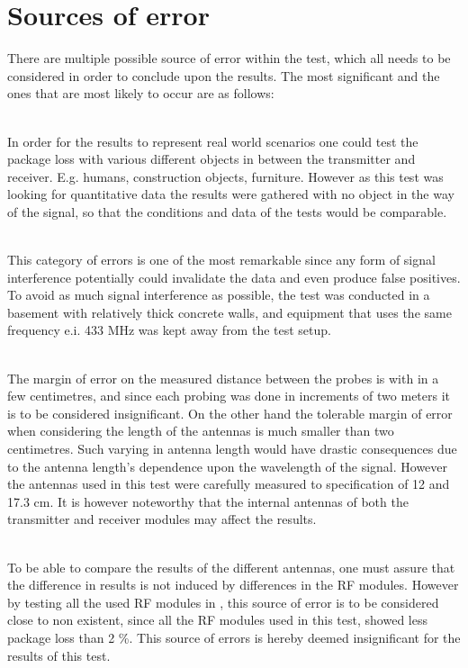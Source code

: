 \section*{Sources of error}
There are multiple possible source of error within the test, which all needs to be considered in order to conclude upon the results.
The most significant and the ones that are most likely to occur are as follows:
\begin{description}[labelindent=\parindent]
    \item[Objects placed in the way of the signal] \hfill \\
    In order for the results to represent real world scenarios one could test the package loss with various different objects in between the transmitter and receiver. 
    E.g. humans, construction objects, furniture.
    However as this test was     looking for quantitative data the results were gathered with no object in the way of the signal, so that the conditions and data of the tests would be comparable.
    \item[Signal interference] \hfill \\
    This category of errors is one of the most remarkable since any form of signal interference potentially could invalidate the data and even produce false positives.
    To avoid as much signal interference as possible, the test was conducted in a basement with relatively thick concrete walls, and equipment that uses the same frequency e.i. 433 MHz was kept away from the test setup.
    \item[Inaccuracy in distance and antenna length] \hfill \\
    The margin of error on the measured distance between the probes is with in a few centimetres, and since each probing was done in increments of two meters it is to be considered insignificant.
    On the other hand the tolerable margin of error when considering the length of the antennas is much smaller than two centimetres.
    Such varying in antenna length would have drastic consequences due to the antenna length's dependence upon the wavelength of the signal.
    However the antennas used in this test were carefully measured to specification of 12 and 17.3 cm.
    It is however noteworthy that the internal antennas of both the transmitter and receiver modules may affect the results.
    \item[Difference in RF modules] \hfill \\
    To be able to compare the results of the different antennas, one must assure that the difference in results is not induced by differences in the RF modules.
    However by testing all the used RF modules in , this source of error is to be considered close to non existent, since all the RF modules used in this test, showed less package loss than 2 \%.
    This source of errors is hereby deemed insignificant for the results of this test.
\end{description}

